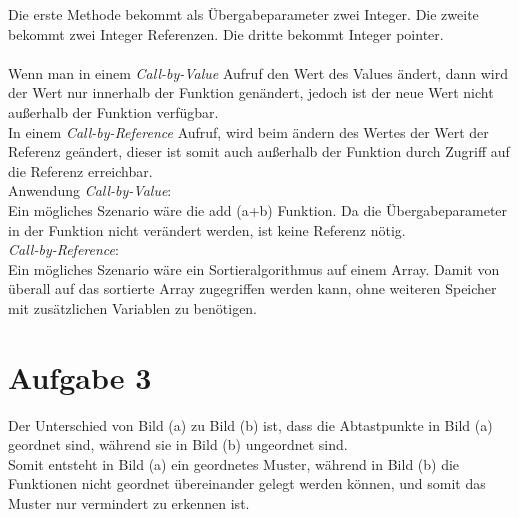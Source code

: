 \documentclass[12pt]{article}
\begin{document}
\begin{enumerate}[a)]
\begin{lstlisting}
\end{lstlisting}  
Die erste Methode bekommt als Übergabeparameter zwei Integer. Die zweite bekommt zwei Integer Referenzen. Die dritte bekommt Integer pointer.\\
\\
Wenn man in einem \emph{Call-by-Value} Aufruf den Wert des Values \"andert, dann wird der Wert nur innerhalb der Funktion gen\"andert, jedoch ist der neue Wert nicht au{\ss}erhalb der Funktion verf\"ugbar.\\
In einem \emph{Call-by-Reference} Aufruf, wird beim \"andern des Wertes der Wert der Referenz ge\"andert, dieser ist somit auch au{\ss}erhalb der Funktion durch Zugriff auf die Referenz erreichbar.\\
Anwendung \emph{Call-by-Value}:\\
Ein mögliches Szenario wäre die add (a+b) Funktion. Da die Übergabeparameter in der Funktion nicht verändert werden, ist keine Referenz nötig.\\
\emph{Call-by-Reference}:\\
Ein mögliches Szenario wäre ein Sortieralgorithmus auf einem Array. Damit von überall auf das sortierte Array zugegriffen werden kann, ohne weiteren Speicher mit zusätzlichen Variablen zu benötigen.
\end{enumerate}

\section*{Aufgabe 3}
Der Unterschied von Bild (a) zu Bild (b) ist, dass die Abtastpunkte in Bild (a) geordnet sind, w\"ahrend sie in Bild (b) ungeordnet sind.\\
Somit entsteht in Bild (a) ein geordnetes Muster, w\"ahrend in Bild (b) die Funktionen nicht geordnet \"ubereinander gelegt werden k\"onnen, und somit das Muster nur vermindert zu erkennen ist. 
\end{document}
